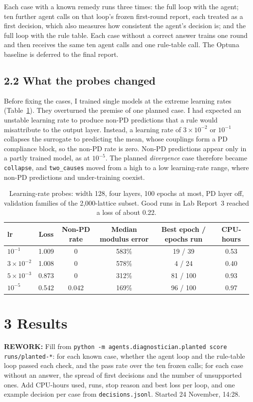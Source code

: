 \documentclass[11pt]{article}
\newcommand{\rework}[1]{\noindent\colorbox{yellow!40}{\parbox{\dimexpr\linewidth-2\fboxsep}{%
  \small\textbf{REWORK:} #1}}\par}
\begin{document}
Each case with a known remedy runs three times: the full loop with the agent; ten further agent
calls on that loop's frozen first-round report, each treated as a first decision, which also
measures how consistent the agent's decision is; and the full loop with the rule table. Each case
without a correct answer trains one round and then receives the same ten agent calls and one
rule-table call. The Optuna baseline is deferred to the final report.

\subsection*{2.2 \quad What the probes changed}
Before fixing the cases, I trained single models at the extreme learning rates
(Table~\ref{tab:probe}). They overturned the premise of one planned case. I had expected an
unstable learning rate to produce non-PD predictions that a rule would misattribute to the output
layer. Instead, a learning rate of $3\times10^{-2}$ or $10^{-1}$ collapses the surrogate to
predicting the mean, whose couplings form a PD compliance block, so the non-PD rate is zero.
Non-PD predictions appear only in a partly trained model, as at $10^{-5}$. The planned
\emph{divergence} case therefore became \texttt{collapse}, and \texttt{two\_causes} moved from a
high to a low learning-rate range, where non-PD predictions and under-training coexist.

\begin{table}[!htb]\centering\small
\caption{Learning-rate probes: width 128, four layers, 100 epochs at most, PD layer off,
validation families of the 2,000-lattice subset. Good runs in Lab Report~3 reached a loss of
about 0.22.}\label{tab:probe}
\begin{tabular}{@{}lccccc@{}}\toprule
lr & Loss & Non-PD rate & Median modulus error & Best epoch / epochs run & CPU-hours\\\midrule
$10^{-1}$ & 1.009 & 0 & 583\% & 19 / 39 & 0.53\\
$3\times10^{-2}$ & 1.008 & 0 & 578\% & 4 / 24 & 0.40\\
$5\times10^{-3}$ & 0.873 & 0 & 312\% & 81 / 100 & 0.93\\
$10^{-5}$ & 0.542 & 0.042 & 169\% & 96 / 100 & 0.97\\\bottomrule
\end{tabular}
\end{table}

\section*{3 \quad Results}
\rework{Fill from \texttt{python -m agents.diagnostician.planted score runs/planted-*}: for each
known case, whether the agent loop and the rule-table loop passed each check, and the pass rate
over the ten frozen calls; for each case without an answer, the spread of first decisions and the
number of unsupported ones. Add CPU-hours used, runs, stop reason and best loss per loop, and one
example decision per case from \texttt{decisions.jsonl}. Started 24 November, 14:28.}
\end{document}
